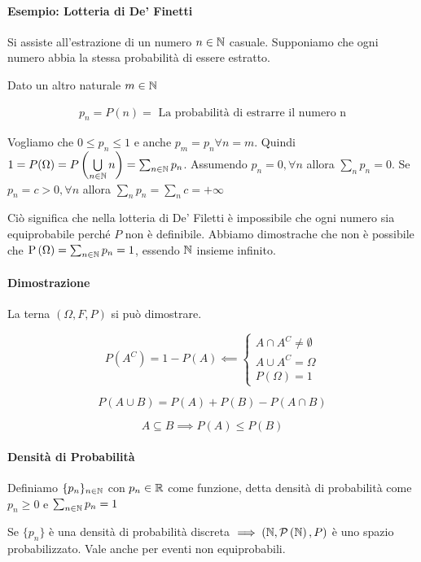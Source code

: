 \paragraph{Esempio: Lotteria di De' Finetti}
Si assiste all'estrazione di un numero $ n \in \mathbb{N} $ casuale. Supponiamo che ogni numero abbia la stessa probabilità di essere estratto.

Dato un altro naturale $ m \in \mathbb{N} $

\begin{align*}
p_n = P(n) = \text{ La probabilità di estrarre il numero n}
\end{align*}

Vogliamo che  $ 0 \leq p_n \leq 1 $ e anche $ p_m = p_n \forall n = m $. Quindi $ 1 = P(\Omega) = P \left( \bigcup\limits_{n \in \mathbb{N}} n \right) = \sum_{n \in \mathbb{N}} p_n $. Assumendo $ p_n = 0, \forall n $ allora $ \sum_{n} p_n = 0 $. Se $ p_n = c > 0, \forall n $ allora $ \sum_{n} p_n = \sum_{n} c = + \infty $

Ciò significa che nella lotteria di De' Filetti è impossibile che ogni numero sia equiprobabile perché $ P $ non è definibile. Abbiamo dimostrache che non è possibile che $ \text{P}\left(\Omega\right) = \sum_{n \in \mathbb{N}} p_n = 1$, essendo $ \mathbb{N} $ insieme infinito.

\paragraph{Dimostrazione}

La terna $ (\Omega, F, P) $ si può dimostrare.

\[ P(A^C) = 1 - P(A) \impliedby \begin{cases}
A \cap A^C \neq \emptyset \\
A \cup A^C = \Omega \\
P(\Omega) = 1
\end{cases} \]

\[ P(A \cup B) = P(A) + P(B) - P(A \cap B)\]

\[ A \subseteq B \implies P(A) \leq P(B) \]

\paragraph{Densità di Probabilità }

Definiamo $ \{p_n\}_{n \in \mathbb{N}} $ con $ p_n \in \mathbb{R} $ come funzione, detta densità di probabilità come $ p_n \geq 0 $ e $ \sum_{n \in \mathbb{N}} p_n = 1 $ 

Se $ \{p_n\} $ è una densità di probabilità discreta $ \implies \left( \mathbb{N}, \mathcal{P}\left(\mathbb{N}\right), P\right) $ è uno spazio probabilizzato. Vale anche per eventi non equiprobabili.

